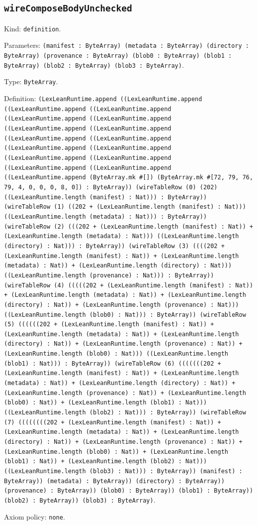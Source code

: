 \documentclass[11pt]{article}
\begin{document}
\subsection*{\texttt{wireComposeBodyUnchecked}}
\noindent Kind: \texttt{definition}.\par
\noindent Parameters: \texttt{(manifest : ByteArray) (metadata : ByteArray) (directory : ByteArray) (provenance : ByteArray) (blob0 : ByteArray) (blob1 : ByteArray) (blob2 : ByteArray) (blob3 : ByteArray)}.\par
\noindent Type: \texttt{ByteArray}.\par
\noindent Definition: \texttt{(LexLeanRuntime.append ((LexLeanRuntime.append ((LexLeanRuntime.append ((LexLeanRuntime.append ((LexLeanRuntime.append ((LexLeanRuntime.append ((LexLeanRuntime.append ((LexLeanRuntime.append ((LexLeanRuntime.append ((LexLeanRuntime.append ((LexLeanRuntime.append ((LexLeanRuntime.append ((LexLeanRuntime.append ((LexLeanRuntime.append ((LexLeanRuntime.append ((LexLeanRuntime.append ((LexLeanRuntime.append (ByteArray.mk \#[]) (ByteArray.mk \#[72, 79, 76, 79, 4, 0, 0, 0, 8, 0]) : ByteArray)) (wireTableRow (0) (202) ((LexLeanRuntime.length (manifest) : Nat))) : ByteArray)) (wireTableRow (1) ((202 + (LexLeanRuntime.length (manifest) : Nat))) ((LexLeanRuntime.length (metadata) : Nat))) : ByteArray)) (wireTableRow (2) (((202 + (LexLeanRuntime.length (manifest) : Nat)) + (LexLeanRuntime.length (metadata) : Nat))) ((LexLeanRuntime.length (directory) : Nat))) : ByteArray)) (wireTableRow (3) ((((202 + (LexLeanRuntime.length (manifest) : Nat)) + (LexLeanRuntime.length (metadata) : Nat)) + (LexLeanRuntime.length (directory) : Nat))) ((LexLeanRuntime.length (provenance) : Nat))) : ByteArray)) (wireTableRow (4) (((((202 + (LexLeanRuntime.length (manifest) : Nat)) + (LexLeanRuntime.length (metadata) : Nat)) + (LexLeanRuntime.length (directory) : Nat)) + (LexLeanRuntime.length (provenance) : Nat))) ((LexLeanRuntime.length (blob0) : Nat))) : ByteArray)) (wireTableRow (5) ((((((202 + (LexLeanRuntime.length (manifest) : Nat)) + (LexLeanRuntime.length (metadata) : Nat)) + (LexLeanRuntime.length (directory) : Nat)) + (LexLeanRuntime.length (provenance) : Nat)) + (LexLeanRuntime.length (blob0) : Nat))) ((LexLeanRuntime.length (blob1) : Nat))) : ByteArray)) (wireTableRow (6) (((((((202 + (LexLeanRuntime.length (manifest) : Nat)) + (LexLeanRuntime.length (metadata) : Nat)) + (LexLeanRuntime.length (directory) : Nat)) + (LexLeanRuntime.length (provenance) : Nat)) + (LexLeanRuntime.length (blob0) : Nat)) + (LexLeanRuntime.length (blob1) : Nat))) ((LexLeanRuntime.length (blob2) : Nat))) : ByteArray)) (wireTableRow (7) ((((((((202 + (LexLeanRuntime.length (manifest) : Nat)) + (LexLeanRuntime.length (metadata) : Nat)) + (LexLeanRuntime.length (directory) : Nat)) + (LexLeanRuntime.length (provenance) : Nat)) + (LexLeanRuntime.length (blob0) : Nat)) + (LexLeanRuntime.length (blob1) : Nat)) + (LexLeanRuntime.length (blob2) : Nat))) ((LexLeanRuntime.length (blob3) : Nat))) : ByteArray)) (manifest) : ByteArray)) (metadata) : ByteArray)) (directory) : ByteArray)) (provenance) : ByteArray)) (blob0) : ByteArray)) (blob1) : ByteArray)) (blob2) : ByteArray)) (blob3) : ByteArray)}.\par
\noindent Axiom policy: \texttt{none}.\par
\end{document}
